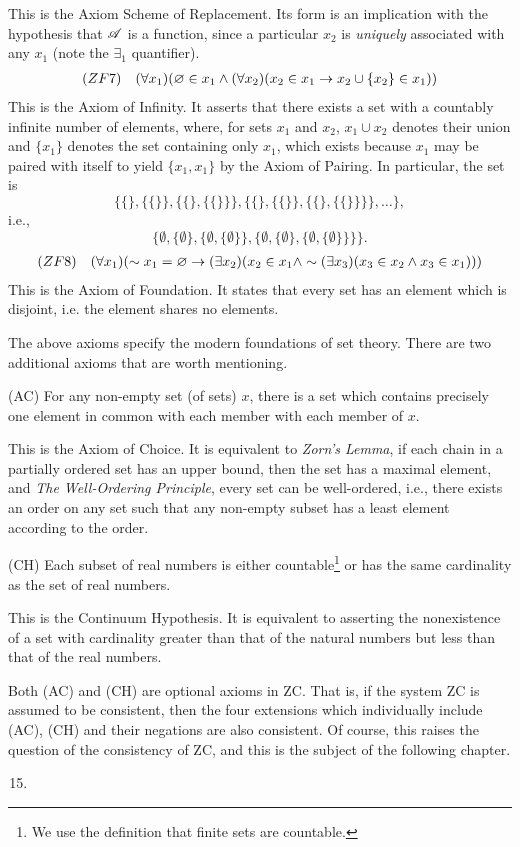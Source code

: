 This is the Axiom Scheme of Replacement. Its form is an implication with the hypothesis that \(\mathscr{A}\) is a function, since a particular \(x_2\) is \textit{uniquely} associated with any \(x_1\) (note the \(\exists_1\) quantifier).
\begin{align*}
  (ZF7)&&
  (\forall x_1)(\varnothing \in x_1 \land (\forall x_2)(x_2 \in x_1 \rightarrow x_2 \cup \{x_2\} \in x_1))
\end{align*}
This is the Axiom of Infinity. It asserts that there exists a set with a countably infinite number of elements, where, for sets \(x_1\) and \(x_2\), \(x_1 \cup x_2\) denotes their union and \(\{x_1\}\) denotes the set containing only \(x_1\), which exists because \(x_1\) may be paired with itself to yield \(\{x_1, x_1\}\) by the Axiom of Pairing. In particular, the set is
\[\{\{\}, \{\{\}\}, \{\{\}, \{\{\}\}\}, \{\{\}, \{\{\}\}, \{\{\}, \{\{\}\}\}\}, \dots\},\]
i.e.,
\[\{\emptyset, \{\emptyset\}, \{\emptyset, \{\emptyset\}\}, \{\emptyset, \{\emptyset\}, \{\emptyset, \{\emptyset\}\}\}\}.\]
\begin{align*}
  (ZF8)&&
  (\forall x_1)(\sim x_1 = \varnothing \rightarrow (\exists x_2)(x_2 \in x_1 \land \sim(\exists x_3)(x_3 \in x_2 \land x_3 \in x_1)))
\end{align*}
This is the Axiom of Foundation. It states that every set has an element which is disjoint, i.e. the element shares no elements.

The above axioms specify the modern foundations of set theory. There are two additional axioms that are worth mentioning.

\medskip
(AC) For any non-empty set (of sets) \(x\), there is a set which contains precisely one element in common with each member with each member of \(x\).
\medskip

This is the Axiom of Choice. It is equivalent to \textit{Zorn's Lemma}, if each chain in a partially ordered set has an upper bound, then the set has a maximal element, and \textit{The Well-Ordering Principle}, every set can be well-ordered, i.e., there exists an order on any set such that any non-empty subset has a least element according to the order.

\medskip
(CH) Each subset of real numbers is either countable\footnote{We use the definition that finite sets are countable.} or has the same cardinality as the set of real numbers.
\medskip

This is the Continuum Hypothesis. It is equivalent to asserting the nonexistence of a set with cardinality greater than that of the natural numbers but less than that of the real numbers.

Both (AC) and (CH) are optional axioms in ZC. That is, if the system ZC is assumed to be consistent, then the four extensions which individually include (AC), (CH) and their negations are also consistent. Of course, this raises the question of the consistency of ZC, and this is the subject of the following chapter.

\solutions{}
\begin{enumerate}
  \setcounter{enumi}{14}

  \item %
\end{enumerate}

